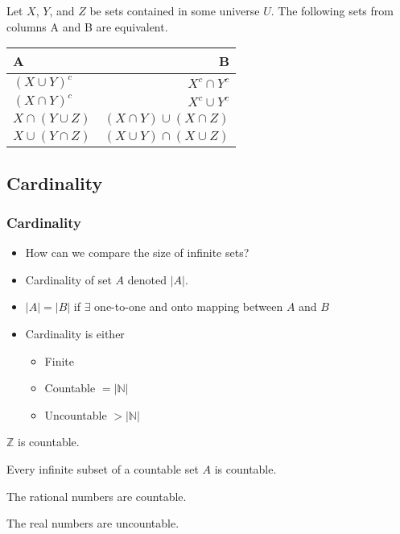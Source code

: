 \documentclass[compress]{beamer}
\begin{document}
\begin{frame}
  \begin{corollary}
    Let $X$, $Y$, and $Z$ be sets contained in some universe $U$. 
    The following sets from columns A and B are equivalent.
    \begin{centering}
      \begin{tabular}{l r}
        A       & B \\ \hline
        $(X \cup Y)^c$ & $X^c \cap Y^c$ \\
        $(X \cap Y)^c$ & $X^c \cup Y^c$ \\
        $X \cap (Y \cup Z)$ & $(X \cap Y) \cup (X \cap Z)$ \\
        $X \cup (Y \cap Z)$ & $(X \cup Y) \cap (X \cup Z)$
      \end{tabular}
    \end{centering}
  \end{corollary}
\end{frame}

\subsection{Cardinality \label{s:card}}

\begin{frame}
  \frametitle{Cardinality}
  \begin{itemize}
  \item How can we compare the size of infinite sets?
  \item Cardinality of set $A$ denoted $|A|$. 
  \item $|A| = |B|$ if $\exists$ one-to-one and onto mapping between
    $A$ and $B$
  \item Cardinality is either
    \begin{itemize}
    \item Finite
    \item Countable $=|\mathbb{N}|$
    \item Uncountable $>|\mathbb{N}|$ 
    \end{itemize}
  \end{itemize}
\end{frame}

\begin{frame}
  \begin{lemma}
    $\mathbb{Z}$ is countable. 
  \end{lemma}
  
  \begin{theorem} \label{thm:countsubset}
    Every infinite subset of a countable set $A$ is countable.
  \end{theorem}

  \begin{theorem}
    The rational numbers are countable.
  \end{theorem}
  
  \begin{theorem}
    The real numbers are uncountable.
  \end{theorem}
\end{frame}
\end{document}
